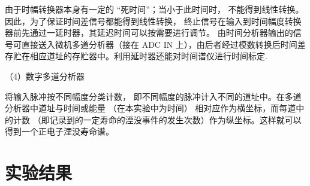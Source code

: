 \documentclass[hyperref]{ctexart}
\begin{document}
\begin{multicols}{2}
	由于时幅转换器本身有一定的 “死时间”；当小于此时间时， 不能得到线性转换。 因此，为了保证时间差信号都能得到线性转换， 终止信号在输入到时间幅度转换器前先通过一延时器，其延迟时间可以按需要进行调节。 由时间分析器输出的信号可直接送入微机多道分析器（接在 ADC IN 上），由后者经过模数转换后时间差存贮在相应道址的存贮器中。利用延时器还能对时间谱仪进行时间标定.

	（4）数字多道分析器

	将输入脉冲按不同幅度分类计数， 即不同幅度的脉冲计入不同的道址中。在多道分析器中道址与时间或能量 （在本实验中为时间） 相对应作为横坐标，而每道中的计数 （即记录到的一定寿命的湮没事件的发生次数）作为纵坐标。这样就可以得到一个正电子湮没寿命谱。

\section{实验结果}

\end{multicols}
\end{document}
